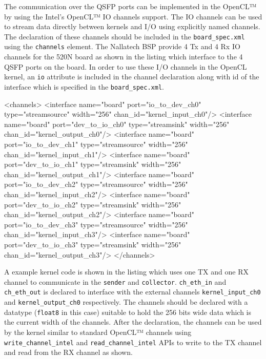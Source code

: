 The communication over the QSFP ports can be implemented in the OpenCL™ by using the
Intel's OpenCL™ IO channels support. The IO channels can be used to stream data
directly between kernels and I/O using explicitly named channels. The declaration
of these channels should be included in the \texttt{board\_spec.xml} using the
\texttt{channels} element. The Nallatech BSP provide 4 Tx and 4 Rx IO channels for the 520N board
as shown in the listing {} which interface to the 4 QSFP ports on the board.
In order to use these I/O channels in the OpenCL kernel,
an \texttt{io} attribute is included in the channel declaration along with id of
the interface which is specified in the \texttt{board\_spec.xml}.

\begin{XmlCode}
<channels>
    <interface name="board" port="io_to_dev_ch0" type="streamsource" width="256" chan_id="kernel_input_ch0"/>
    <interface name="board" port="dev_to_io_ch0" type="streamsink" width="256" chan_id="kernel_output_ch0"/>
    <interface name="board" port="io_to_dev_ch1" type="streamsource" width="256" chan_id="kernel_input_ch1"/>
    <interface name="board" port="dev_to_io_ch1" type="streamsink" width="256" chan_id="kernel_output_ch1"/>
    <interface name="board" port="io_to_dev_ch2" type="streamsource" width="256" chan_id="kernel_input_ch2"/>
    <interface name="board" port="dev_to_io_ch2" type="streamsink" width="256" chan_id="kernel_output_ch2"/>
    <interface name="board" port="io_to_dev_ch3" type="streamsource" width="256" chan_id="kernel_input_ch3"/>
    <interface name="board" port="dev_to_io_ch3" type="streamsink" width="256" chan_id="kernel_output_ch3"/>
</channels>
\end{XmlCode}
A example kernel code is shown in the listing {} which uses one TX and one RX channel to
communicate in the \texttt{sender} and \texttt{collector}.
\texttt{ch\_eth\_in} and \texttt{ch\_eth\_out} is declared to interface with
the external channels \texttt{kernel\_input\_ch0} and \texttt{kernel\_output\_ch0} respectively.
The channels should be declared with a datatype (\texttt{float8} in this case)
suitable to hold the 256 bits wide data which is the current width of the channels.
After the declaration, the channels can be used by the kernel similar to standard OpenCL™
channels using \texttt{write\_channel\_intel} and \texttt{read\_channel\_intel} APIs to write
to the TX channel and read from the RX channel as shown.


